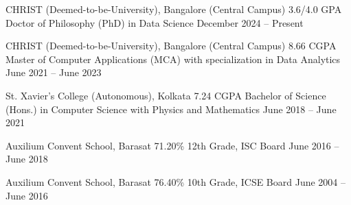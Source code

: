 \documentclass[../main.tex]{subfiles}
\begin{document}
\resumeSubHeadingListStart

\resumeEduHeading
{CHRIST (Deemed-to-be-University), Bangalore (Central Campus)}
{3.6/4.0 GPA}
{Doctor of Philosophy (PhD) in Data Science}
{December 2024 -- Present}
\vspace{0.2em}

\resumeEduHeading
{CHRIST (Deemed-to-be-University), Bangalore (Central Campus)}
{8.66 CGPA}
{Master of Computer Applications (MCA) with specialization in Data Analytics}
{June 2021 -- June 2023}
\vspace{0.2em}

\resumeEduHeading
{St. Xavier's College (Autonomous), Kolkata}
{7.24 CGPA}
{Bachelor of Science (Hons.) in Computer Science with Physics and Mathematics}
{June 2018 -- June 2021}
\vspace{0.2em}

\resumeEduHeading
{Auxilium Convent School, Barasat}
{71.20\%}
{12th Grade, ISC Board}
{June 2016 -- June 2018}
\vspace{0.2em}

\resumeEduHeading
{Auxilium Convent School, Barasat}
{76.40\%}
{10th Grade, ICSE Board}
{June 2004 -- June 2016}

\resumeSubHeadingListEnd
\end{document}
